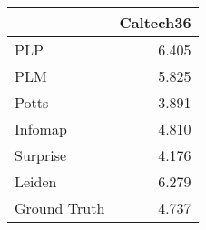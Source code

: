 \begin{tabular}{lr}
\toprule
{} & Caltech36 \\
\midrule
PLP          &     6.405 \\
PLM          &     5.825 \\
Potts        &     3.891 \\
Infomap      &     4.810 \\
Surprise     &     4.176 \\
Leiden       &     6.279 \\
Ground Truth &     4.737 \\
\bottomrule
\end{tabular}
